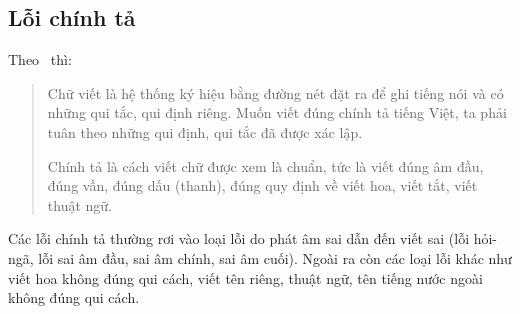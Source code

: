 \documentclass[a4paper,oneside,14pt]{extbook} %
\begin{document}


\subsection{Lỗi chính tả}


Theo~\cite{LoiChinhTa} thì:
\begin{verse}
  Chữ viết là hệ thống ký hiệu bằng đường nét đặt ra để ghi tiếng nói
  và có những qui tắc, qui định riêng. Muốn viết đúng chính tả tiếng
  Việt, ta phải tuân theo những qui định, qui tắc đã được xác lập.

  Chính tả là cách viết chữ được xem là chuẩn, tức là viết đúng âm
  đầu, đúng vần, đúng dấu (thanh), đúng quy định về viết hoa, viết
  tắt, viết thuật ngữ.
\end{verse}

Các lỗi chính tả thường rơi vào loại lỗi do phát âm sai dẫn đến viết
sai (lỗi hỏi-ngã, lỗi sai âm đầu, sai âm chính, sai âm cuối). Ngoài ra
còn các loại lỗi khác như viết hoa không đúng qui cách, viết tên
riêng, thuật ngữ, tên tiếng nước ngoài không đúng qui cách.





\end{document}
